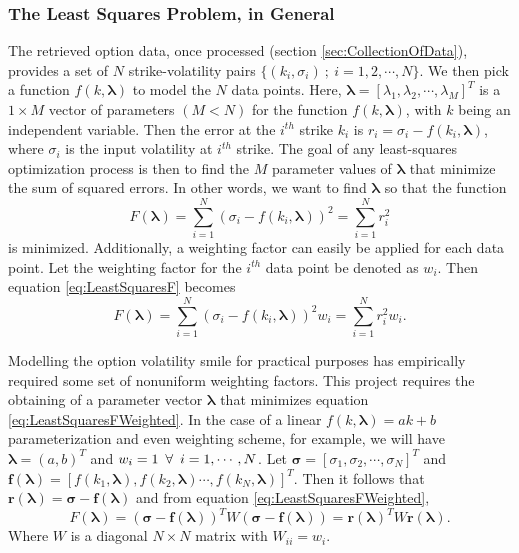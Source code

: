 \documentclass[12pt, a4paper, notitlepage]{article}
\numberwithin{equation}{subsection}
\numberwithin{figure}{subsection}
\numberwithin{table}{subsection}
\newcommand{\newpar}{\newline \newline}
\newcommand{\lambdaVect}{\pmb{\lambda}}
\begin{document}
\subsubsection{The Least Squares Problem, in General}
The retrieved option data, once processed (section \ref{sec:CollectionOfData}), provides a set of $N$ strike-volatility pairs $\{(k_i,\sigma_i) \ ; \ i = 1,2,\cdots,N\}$.  We then pick a function $f(k,\lambdaVect)$ to model the $N$ data points.  Here, $\lambdaVect = [\lambda_1, \lambda_2, \cdots, \lambda_M]^T$ is a $1 \times M$ vector of parameters $(M < N)$ for the function $f(k,\lambdaVect)$, with $k$ being an independent variable.  Then the error at the $i^{th}$ strike $k_i$ is $r_i = \sigma_i - f(k_i, \lambdaVect)$, where $\sigma_i$ is the input volatility at $i^{th}$ strike.
\newpar
The goal of any least-squares optimization process is then to find the $M$ parameter values of $\lambdaVect$ that minimize the sum of squared errors.  In other words, we want to find $\lambdaVect$ so that the function
\begin{equation}
	F(\lambdaVect) = \sum_{i=1}^{N}(\sigma_i - f(k_i,\lambdaVect))^2 = \sum_{i=1}^{N}r_i^2
    \label{eq:LeastSquaresF}
\end{equation}
is minimized.
\newpar
Additionally, a weighting factor can easily be applied for each data point.  Let the weighting factor for the $i^{th}$ data point be denoted as $w_i$.  Then equation \ref{eq:LeastSquaresF} becomes
\begin{equation}
	F(\lambdaVect) = \sum_{i=1}^{N}(\sigma_i - f(k_i,\lambdaVect))^2w_i = \sum_{i=1}^{N}r_i^2w_i.
    \label{eq:LeastSquaresFWeighted}
\end{equation}

Modelling the option volatility smile for practical purposes has empirically required some set of nonuniform weighting factors.  This project requires the obtaining of a parameter vector $\lambdaVect$ that minimizes equation \ref{eq:LeastSquaresFWeighted}.  In the case of a linear $f(k,\lambdaVect) = ak + b$ parameterization and even weighting scheme, for example, we will have $\lambdaVect = (a, b)^T$ and $w_i = 1 \enskip \forall \enskip i = 1, \cdots, N$.
\newpar
Let $\pmb{\sigma} = [\sigma_1, \sigma_2, \cdots, \sigma_N]^T$ and
    $\pmb{f}(\lambdaVect) = [f(k_1,\lambdaVect), f(k_2,\lambdaVect)\cdots, f(k_N,\lambdaVect)]^T$.
Then it follows that $\pmb{r}(\lambdaVect) = \pmb{\sigma} - \pmb{f}(\lambdaVect)$ and from equation \ref{eq:LeastSquaresFWeighted},
\begin{equation}
    F(\lambdaVect) = (\pmb{\sigma} - \pmb{f}(\lambdaVect))^T W (\pmb{\sigma} - \pmb{f}(\lambdaVect)) = \pmb{r}(\lambdaVect)^T W \pmb{r}(\lambdaVect).
    \label{eq:LeastSquaresFWeightedMatrix}
\end{equation}
Where $W$ is a diagonal $N \times N$ matrix with $W_{ii} = w_i$.
\end{document}
